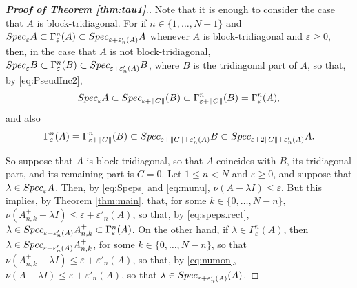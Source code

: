 \documentclass[preprint,1p,11pt]{elsarticle}
\newcommand\T{{\mathbb T}}
\newcommand\eps{{\varepsilon}}
\newcommand\Specn{{\rm Spec}}   %
\newcommand\Speps{{\rm Spec}_\eps}
\numberwithin{equation}{section}   %
\numberwithin{figure}{section}  %
\begin{document}
\begin{proof}[{\bf Proof of Theorem  \ref{thm:tau1}}.] Note that it is enough to consider the case that $A$ is block-tridiagonal. For if $n\in\{1,\ldots,N-1\}$ %
and $\Speps A \subset \Gamma^{n}_{\eps}(A)\subset \Specn_{\eps+\eps'_n(A)}A$  whenever $A$ is block-tridiagonal and $\eps\geq 0$, then, in the case that $A$ is not block-tridiagonal, $\Speps B \subset    \Gamma^{n}_{\eps}(B)\subset \Specn_{\eps+\eps'_n(A)}B$, where $B$ is the tridiagonal part of $A$, so that, by \eqref{eq:PseudInc2}, 
$$
\Speps A \subset \Specn_{\eps+\|C\|}(B) \subset \Gamma^{n}_{\eps+\|C\|}(B)=\Gamma^{n}_\eps(A),
$$ 
and also
$$
\Gamma^{n}_\eps(A)= \Gamma^{n}_{\eps+\|C\|}(B)\subset \Specn_{\eps+\|C\|+\eps'_n(A)}B \subset \Specn_{\eps+2\|C\|+\eps'_n(A)}A.
$$


So suppose that $A$ is block-tridiagonal, so that $A$ coincides with $B$, its tridiagonal part, and its remaining part is $C=0$. Let $1\leq n<N$ and  $\eps\geq 0$, and
 suppose that $\lambda\in \Speps A$. Then, by \eqref{eq:Speps} and \eqref{eq:munu}, $\nu(A-\lambda I)\leq \eps$. But this implies, by Theorem \ref{thm:main}, that, for some $k\in \{0,\ldots,N-n\}$,  $\nu(A^{+}_{n,k}-\lambda I) \leq \eps+\eps'_{n}(A)$,  so that, by \eqref{eq:speps.rect},  $\lambda\in \Specn_{\eps+\eps'_{n}(A)} A^{+}_{n,k} \subset \Gamma^{n}_\eps(A)$. On the other hand, if $\lambda\in \Gamma^{n}_\eps(A)$, then 
 $\lambda\in \Specn_{\eps+\eps'_{n}(A)} A^{+}_{n,k}$, for some $k\in \{0,\ldots,N-n\}$, so that $\nu(A^+_{n,k}-\lambda I) \leq \eps+\eps'_{n}(A)$, so that, by \eqref{eq:numon}, $\nu(A-\lambda I)\leq \eps+\eps'_{n}(A)$, so that $\lambda \in \Specn_{\eps+\eps'_{n}(A)}(A)$.
\end{proof}
\end{document}
